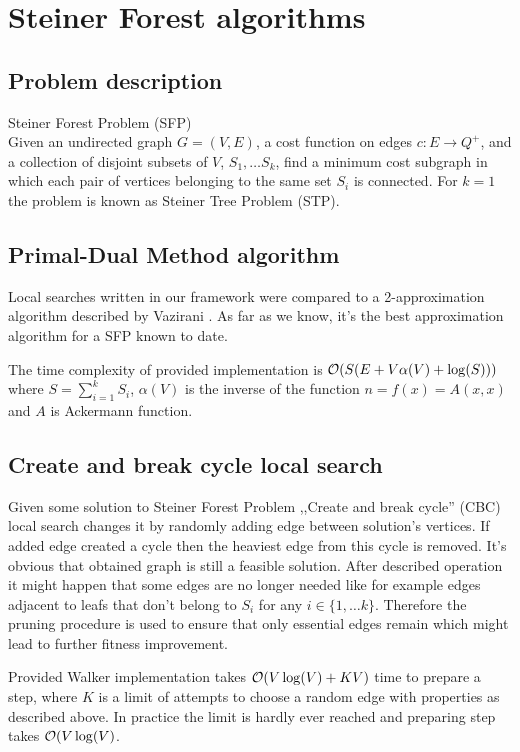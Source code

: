 \chapter{Steiner Forest algorithms}

\section{Problem description}
Steiner Forest Problem (SFP)\\
Given an undirected graph $G = (V, E)$, a cost function on edges $c : E \rightarrow Q^+$, and a collection of disjoint subsets of $V$, $S_1, \dots S_k$, find a minimum cost subgraph in which each pair of vertices belonging to the same set $S_i$ is connected.
For $k = 1$ the problem is known as Steiner Tree Problem (STP).

\section{Primal-Dual Method algorithm}
Local searches written in our framework were compared to a 2-approximation algorithm described by Vazirani \cite{Vazirani}. As far as we know, it's the best approximation algorithm for a SFP known to date.

The time complexity of provided implementation is $\mathcal{O}(S(E + V\alpha(V) + \log(S)))$ where $S = \sum_{i = 1}^{k}S_i$, $\alpha(V)$ is the inverse of the function $n = f(x) = A(x, x)$ and $A$ is Ackermann function.

\section{Create and break cycle local search}
Given some solution to Steiner Forest Problem ,,Create and break cycle'' (CBC) local search changes it by randomly adding edge between solution's vertices. If added edge created a cycle then the heaviest edge from this cycle is removed. It's obvious that obtained graph is still a feasible solution. After described operation it might happen that some edges are no longer needed like for example edges adjacent to leafs that don't belong to $S_i$ for any $i \in \{1, \dots k\}$. Therefore the pruning procedure is used to ensure that only essential edges remain which might lead to further fitness improvement.

Provided Walker implementation takes $\mathcal{O}(V\log(V) + KV)$ time to prepare a step, where $K$ is a limit of attempts to choose a random edge with properties as described above. In practice the limit is hardly ever reached and preparing step takes $\mathcal{O}(V\log(V)$.


